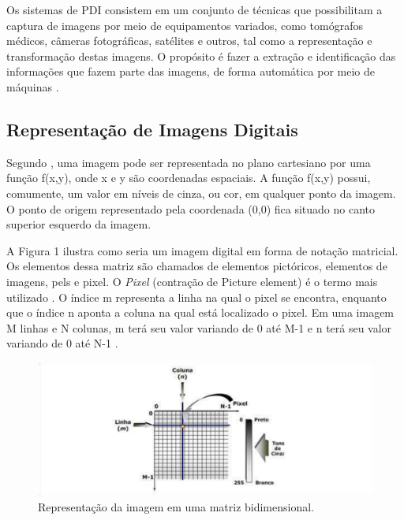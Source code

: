 Os sistemas de PDI consistem em um conjunto de técnicas que possibilitam a captura de imagens por meio de equipamentos variados, como tomógrafos médicos, câmeras fotográficas, satélites e outros, tal como a representação e transformação destas imagens. O propósito é fazer a extração e identificação das informações que fazem parte das imagens, de forma automática por meio de máquinas \cite{PEDRINI2008}.



\subsection{Representação de Imagens Digitais}

Segundo , uma imagem pode ser representada no plano cartesiano por uma função f(x,y), onde x e y são coordenadas espaciais. A função f(x,y) possui, comumente, um valor em níveis de cinza, ou cor, em qualquer ponto da imagem. O ponto de origem representado pela coordenada (0,0) fica situado no canto superior esquerdo da imagem.




A Figura 1 ilustra como seria um imagem digital em forma de notação matricial. Os elementos dessa matriz são chamados de elementos pictóricos, elementos de imagens, pels e pixel. O \textit{Pixel} (contração de Picture element) é o termo mais utilizado \cite{GONZALEZ2006}. O índice m representa a linha na qual o pixel se encontra, enquanto que o índice n aponta a coluna na qual está localizado o pixel. Em uma imagem M linhas e N colunas, m terá seu valor variando de 0 até M-1 e n terá seu valor variando de 0 até N-1 \cite{Almeida2018}. 

 \begin{figure}[h]
	\centering
	\includegraphics[width=1.0\textwidth]{Imagens/imagem1} 
	\caption[Texto que vai aparecer na lista de fig.]{Representação da imagem em uma matriz bidimensional.}
	\label{fig:tux_laplace}
\end{figure}

